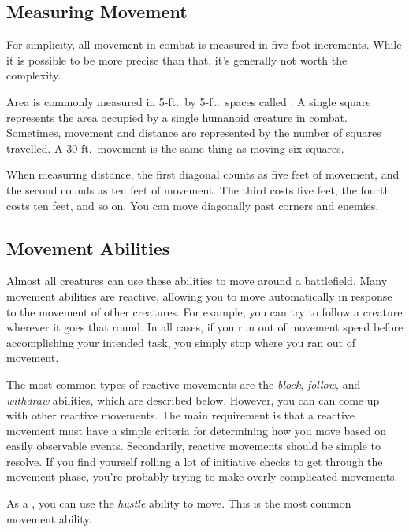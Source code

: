   \subsection{Measuring Movement}

    For simplicity, all movement in combat is measured in five-foot increments.
    While it is possible to be more precise than that, it's generally not worth the complexity.

     Area is commonly measured in 5-ft.\ by 5-ft.\ spaces called .
    A single square represents the area occupied by a single humanoid creature in combat.
    Sometimes, movement and distance are represented by the number of squares travelled.
    A 30-ft.\ movement is the same thing as moving six squares.

     When measuring distance, the first diagonal counts as five feet of movement, and the second counds as ten feet of movement.
    The third costs five feet, the fourth costs ten feet, and so on.
    You can move diagonally past corners and enemies.

  \subsection{Movement Abilities}\label{Movement Abilities}

    Almost all creatures can use these abilities to move around a battlefield.
    Many movement abilities are reactive, allowing you to move automatically in response to the movement of other creatures.
    For example, you can try to follow a creature wherever it goes that round.
    In all cases, if you run out of movement speed before accomplishing your intended task, you simply stop where you ran out of movement.

    The most common types of reactive movements are the \textit{block}, \textit{follow}, and \textit{withdraw} abilities, which are described below.
    However, you can can come up with other reactive movements.
    The main requirement is that a reactive movement must have a simple criteria for determining how you move based on easily observable events.
    Secondarily, reactive movements should be simple to resolve.
    If you find yourself rolling a lot of initiative checks to get through the movement phase, you're probably trying to make overly complicated movements.

     As a , you can use the \textit{hustle} ability to move.
    This is the most common movement ability.

